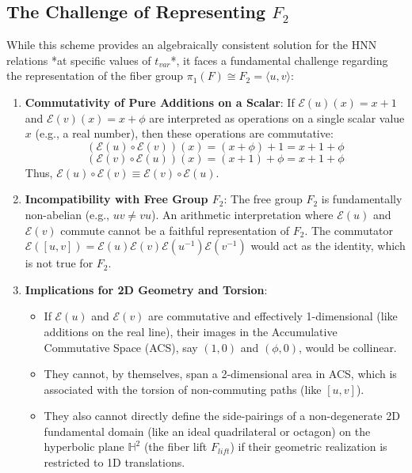 \documentclass[12pt, a4paper]{article}
\begin{document}
\subsection{The Challenge of Representing $F_2$}
While this scheme provides an algebraically consistent solution for the HNN relations *at specific values of $t_{var}$*, it faces a fundamental challenge regarding the representation of the fiber group $\pi_1(F) \cong F_2 = \langle u,v \rangle$:
\begin{enumerate}
    \item \textbf{Commutativity of Pure Additions on a Scalar}: If $\mathcal{E}(u)(x) = x+1$ and $\mathcal{E}(v)(x) = x+\phi$ are interpreted as operations on a single scalar value $x$ (e.g., a real number), then these operations are commutative:
        $$ (\mathcal{E}(u) \circ \mathcal{E}(v))(x) = (x+\phi)+1 = x+1+\phi $$
        $$ (\mathcal{E}(v) \circ \mathcal{E}(u))(x) = (x+1)+\phi = x+1+\phi $$
        Thus, $\mathcal{E}(u) \circ \mathcal{E}(v) \equiv \mathcal{E}(v) \circ \mathcal{E}(u)$.
    \item \textbf{Incompatibility with Free Group $F_2$}: The free group $F_2$ is fundamentally non-abelian (e.g., $uv \neq vu$). An arithmetic interpretation where $\mathcal{E}(u)$ and $\mathcal{E}(v)$ commute cannot be a faithful representation of $F_2$. The commutator $\mathcal{E}([u,v]) = \mathcal{E}(u)\mathcal{E}(v)\mathcal{E}(u^{-1})\mathcal{E}(v^{-1})$ would act as the identity, which is not true for $F_2$.
    \item \textbf{Implications for 2D Geometry and Torsion}:
        \begin{itemize}
            \item If $\mathcal{E}(u)$ and $\mathcal{E}(v)$ are commutative and effectively 1-dimensional (like additions on the real line), their images in the Accumulative Commutative Space (ACS), say $(1,0)$ and $(\phi,0)$, would be collinear.
            \item They cannot, by themselves, span a 2-dimensional area in ACS, which is associated with the torsion of non-commuting paths (like $[u,v]$).
            \item They also cannot directly define the side-pairings of a non-degenerate 2D fundamental domain (like an ideal quadrilateral or octagon) on the hyperbolic plane $\mathbb{H}^2$ (the fiber lift $F_{lift}$) if their geometric realization is restricted to 1D translations.
        \end{itemize}
\end{enumerate}
\end{document}
